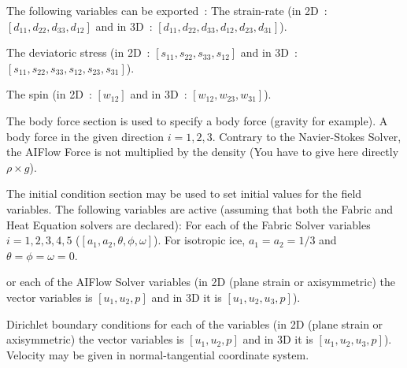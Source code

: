   \sifend
 The following variables can be exported~:
 \sifbegin
%
 The strain-rate (in 2D~: $[d_{11}, d_{22}, d_{33},
d_{12}]$ and in 3D~: $[d_{11}, d_{22}, d_{33}, d_{12}, d_{23}, d_{31}]$).
 \sifend

%
 \sifbegin
%
The deviatoric stress (in 2D~: $[s_{11}, s_{22}, s_{33}, s_{12}]$ and in 3D~: $[s_{11}, s_{22}, s_{33}, s_{12}, s_{23},
s_{31}]$).
 \sifend

%
 \sifbegin
%
 The spin (in 2D~: $[w_{12}]$ and in 3D~: $[w_{12}, w_{23}, w_{31}]$).

\sifend




The body force section is used to specify a body force (gravity for example).
 \sifbegin
%
A body force in the given direction $i=1,2,3$. Contrary to the Navier-Stokes Solver, the AIFlow Force is not multiplied
by the density (You have to give here directly $\rho \times g$).
 \sifend




The initial condition section may be used to set initial values for the field variables. The following variables are
active (assuming that both the Fabric and Heat Equation solvers are declared):
 \sifbegin
%
 For each of the Fabric Solver variables $i=1,2,3,4,5$ ($[a_1 , a_2 , \theta, \phi, \omega]$). For isotropic ice,
 $a_1=a_2=1/3$ and $\theta=\phi=\omega=0$.

%
or each of the AIFlow Solver variables (in 2D (plane strain or axisymmetric) the vector variables is $[u_1, u_2, p]$
and in 3D it is $[u_1, u_2, u_3, p]$).
%
 \sifend

\sifbegin

%
Dirichlet boundary conditions for each of the variables (in 2D (plane strain or axisymmetric) the vector variables is
$[u_1, u_2, p]$ and in 3D it is $[u_1, u_2, u_3, p]$).
%
%
Velocity may be given in normal-tangential coordinate system.

